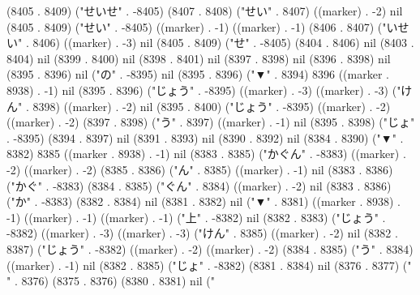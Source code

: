 (8405 . 8409) ("せいせ" . -8405) (8407 . 8408) ("せい" . 8407) ((marker) . -2) nil (8405 . 8409) ("せい" . -8405) ((marker) . -1) ((marker) . -1) (8406 . 8407) ("いせい" . 8406) ((marker) . -3) nil (8405 . 8409) ("せ" . -8405) (8404 . 8406) nil (8403 . 8404) nil (8399 . 8400) nil (8398 . 8401) nil (8397 . 8398) nil (8396 . 8398) nil (8395 . 8396) nil ("の" . -8395) nil (8395 . 8396) ("▼" . 8394) 8396 ((marker . 8938) . -1) nil (8395 . 8396) ("じょう" . -8395) ((marker) . -3) ((marker) . -3) ("けん" . 8398) ((marker) . -2) nil (8395 . 8400) ("じょう" . -8395) ((marker) . -2) ((marker) . -2) (8397 . 8398) ("う" . 8397) ((marker) . -1) nil (8395 . 8398) ("じょ" . -8395) (8394 . 8397) nil (8391 . 8393) nil (8390 . 8392) nil (8384 . 8390) ("▼" . 8382) 8385 ((marker . 8938) . -1) nil (8383 . 8385) ("かぐん" . -8383) ((marker) . -2) ((marker) . -2) (8385 . 8386) ("ん" . 8385) ((marker) . -1) nil (8383 . 8386) ("かぐ" . -8383) (8384 . 8385) ("ぐん" . 8384) ((marker) . -2) nil (8383 . 8386) ("か" . -8383) (8382 . 8384) nil (8381 . 8382) nil ("▼" . 8381) ((marker . 8938) . -1) ((marker) . -1) ((marker) . -1) ("上" . -8382) nil (8382 . 8383) ("じょう" . -8382) ((marker) . -3) ((marker) . -3) ("けん" . 8385) ((marker) . -2) nil (8382 . 8387) ("じょう" . -8382) ((marker) . -2) ((marker) . -2) (8384 . 8385) ("う" . 8384) ((marker) . -1) nil (8382 . 8385) ("じょ" . -8382) (8381 . 8384) nil (8376 . 8377) (" " . 8376) (8375 . 8376) (8380 . 8381) nil ("
